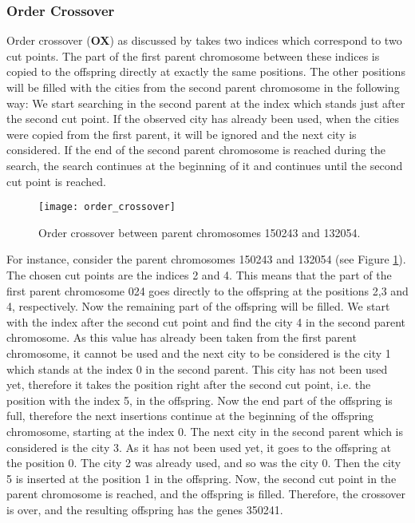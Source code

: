 \subsubsection{Order Crossover}
\label{subsubsec:order}

Order crossover (\textbf{OX}) as discussed by \citeauthor{potvin1996genetic} \cite{potvin1996genetic} takes two indices which correspond to two cut points. The part of the first parent chromosome between these indices is copied to the offspring directly at exactly the same positions. The other positions will be filled with the cities from the second parent chromosome in the following way: We start searching in the second parent at the index which stands just after the second cut point.  If the observed city has already been used, when the cities were copied from the first parent, it will be ignored and the next city is considered. If the end of the second parent chromosome is reached during the search, the search continues at the beginning of it and continues until the second cut point is reached.\par

\begin{figure}[htp] \centering
	\centering
	\texttt{[image: order\_crossover]}
	\caption{Order crossover between parent chromosomes 150243 and 132054.}
	\label{order_crossover}
\end{figure}

For instance, consider the parent chromosomes 150243 and 132054 (see Figure \ref{order_crossover}). The chosen cut points are the indices 2 and 4. This means that the part of the first parent chromosome 024 goes directly to the offspring at the positions 2,3 and 4, respectively. Now the remaining part of the offspring will be filled. We start with the index after the second cut point and find the city 4 in the second parent chromosome. As this value has already been taken from the first parent chromosome, it cannot be used and the next city to be considered is the city 1 which stands at the index 0 in the second parent. This city has not been used yet, therefore it takes the position right after the second cut point, i.e. the position with the index 5, in the offspring. Now the end part of the offspring is full, therefore the next insertions continue at the beginning of the offspring chromosome, starting at the index 0. The next city in the second parent which is considered is the city 3. As it has not been used yet, it goes to the offspring at the position 0. The city 2 was already used, and so was the city 0. Then the city 5 is inserted at the position 1 in the offspring. Now, the second cut point in the parent chromosome is reached, and the offspring is filled. Therefore, the crossover is over, and the resulting offspring has the genes 350241.
\vspace{2cm}

